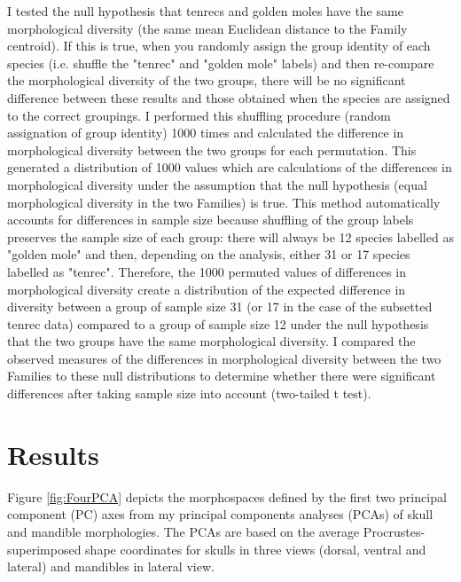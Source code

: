 	I tested the null hypothesis that tenrecs and golden moles have the same morphological diversity (the same mean Euclidean distance to the Family centroid). If this is true, when you randomly assign the group identity of each species (i.e. shuffle the "tenrec" and "golden mole" labels) and then re-compare the morphological diversity of the two groups, there will be no significant difference between these results and those obtained when the species are assigned to the correct groupings. 
	I performed this shuffling procedure (random assignation of group identity) 1000 times and calculated the difference in morphological diversity between the two groups for each permutation. This generated a distribution of 1000 values which are calculations of the differences in morphological diversity under the assumption that the null hypothesis (equal morphological diversity in the two Families) is true. This method automatically accounts for differences in sample size because shuffling of the group labels preserves the sample size of each group: there will always be 12 species labelled as "golden mole" and then, depending on the analysis, either 31 or 17 species labelled as "tenrec". Therefore, the 1000 permuted values of differences in morphological diversity create a distribution of the expected difference in diversity between a group of sample size 31 (or 17 in the case of the subsetted tenrec data) compared to a group of sample size 12 under the null hypothesis that the two groups have the same morphological diversity. I compared the observed measures of the differences in morphological diversity between the two Families to these null distributions to determine whether there were significant differences after taking sample size into account (two-tailed t test).
	

\section{Results}
\label{sect:results}

	Figure \ref{fig:FourPCA} depicts the morphospaces defined by the first two principal component (PC) axes from my principal components analyses (PCAs) of skull and mandible morphologies. The PCAs are based on the average Procrustes-superimposed shape coordinates for skulls in three views (dorsal, ventral and lateral) and mandibles in lateral view.

